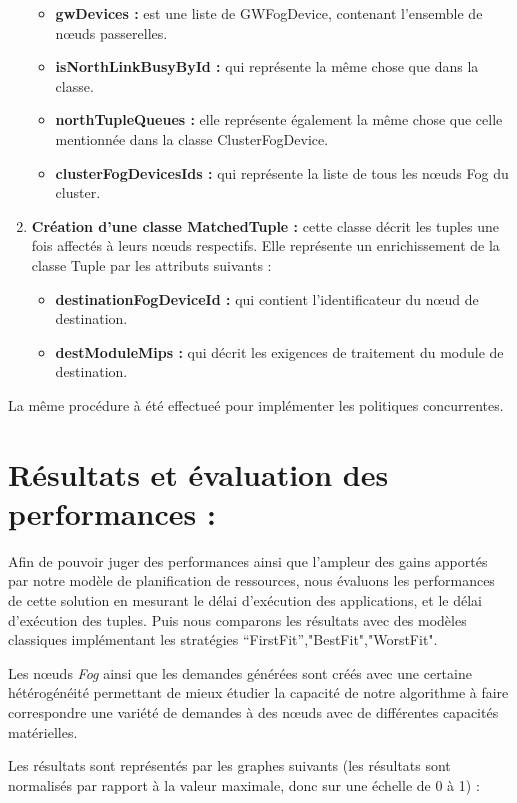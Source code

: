 \begin{enumerate}
\begin{itemize}
     \item \textbf{gwDevices :} est une liste de GWFogDevice, contenant l'ensemble de nœuds passerelles.
     \item \textbf{isNorthLinkBusyById :} qui représente la même chose que dans la classe.
     \item \textbf{northTupleQueues :} elle représente également la même chose que celle mentionnée dans la classe ClusterFogDevice.
     \item \textbf{clusterFogDevicesIds :} qui représente la liste de tous les nœuds Fog du cluster.
     \end{itemize}
     \item \textbf{Création d'une classe MatchedTuple :} cette classe décrit les tuples une fois affectés à leurs nœuds respectifs. Elle représente un enrichissement de la classe Tuple par les attributs suivants :
     \begin{itemize}
         \item \textbf{destinationFogDeviceId :} qui contient l'identificateur du nœud de destination.
         \item \textbf{destModuleMips :} qui décrit les exigences de traitement du module de destination.
     \end{itemize}
\end{enumerate}
La même procédure à été effectueé pour implémenter les politiques concurrentes.

\section{Résultats et évaluation des performances :}
Afin de pouvoir juger des performances ainsi que l'ampleur des gains apportés par notre modèle de planification de ressources, nous évaluons les performances de cette solution en mesurant le délai d'exécution des applications, et le délai d'exécution des tuples. Puis nous comparons les résultats avec des modèles classiques implémentant les stratégies “FirstFit”,"BestFit","WorstFit".\par
Les nœuds \emph{Fog} ainsi que les demandes générées sont créés avec une certaine hétérogénéité permettant de mieux étudier la capacité de notre algorithme à faire correspondre une variété de demandes à des nœuds avec de différentes capacités matérielles.\par
Les résultats sont représentés par les graphes suivants (les résultats sont normalisés par rapport à la valeur maximale, donc sur une échelle de 0 à 1) :

